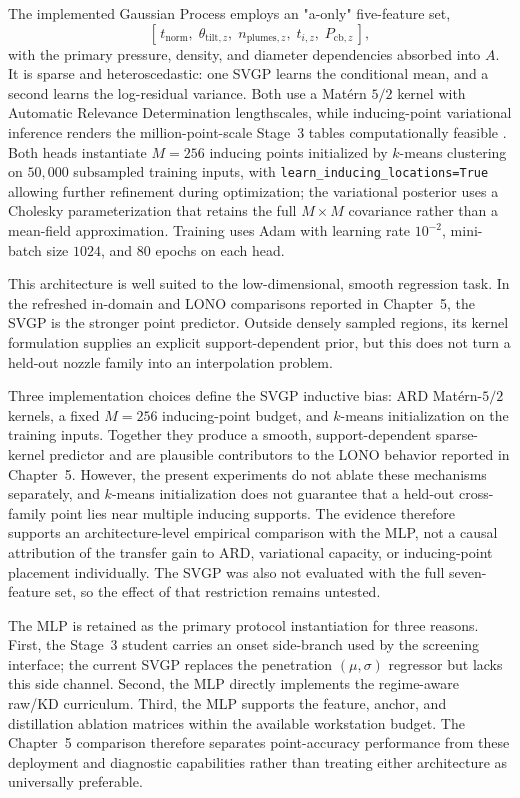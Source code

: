 The implemented Gaussian Process employs an "a-only" five-feature set,
\[
[\,t_{\mathrm{norm}},\;\theta_{\mathrm{tilt},z},\;n_{\mathrm{plumes},z},\;t_{i,z},\;P_{\mathrm{cb},z}\,],
\]
with the primary pressure, density, and diameter dependencies absorbed into $A$. It is sparse and heteroscedastic: one SVGP learns the conditional mean, and a second learns the log-residual variance. Both use a Mat\'ern $5/2$ kernel with Automatic Relevance Determination lengthscales, while inducing-point variational inference renders the million-point-scale Stage~3 tables computationally feasible \cite{RasmussenWilliams2006,HensmanFusiLawrence2013,Titsias2009SparseGP}. Both heads instantiate $M=256$ inducing points initialized by $k$-means clustering on $50{,}000$ subsampled training inputs, with \texttt{learn\_inducing\_locations=True} allowing further refinement during optimization; the variational posterior uses a Cholesky parameterization that retains the full $M\times M$ covariance rather than a mean-field approximation. Training uses Adam with learning rate $10^{-2}$, mini-batch size $1024$, and $80$ epochs on each head.

This architecture is well suited to the low-dimensional, smooth regression task. In the refreshed in-domain and LONO comparisons reported in Chapter~5, the SVGP is the stronger point predictor. Outside densely sampled regions, its kernel formulation supplies an explicit support-dependent prior, but this does not turn a held-out nozzle family into an interpolation problem.

Three implementation choices define the SVGP inductive bias: ARD Mat\'ern-$5/2$ kernels, a fixed $M=256$ inducing-point budget, and $k$-means initialization on the training inputs. Together they produce a smooth, support-dependent sparse-kernel predictor and are plausible contributors to the LONO behavior reported in Chapter~5. However, the present experiments do not ablate these mechanisms separately, and $k$-means initialization does not guarantee that a held-out cross-family point lies near multiple inducing supports. The evidence therefore supports an architecture-level empirical comparison with the MLP, not a causal attribution of the transfer gain to ARD, variational capacity, or inducing-point placement individually. The SVGP was also not evaluated with the full seven-feature set, so the effect of that restriction remains untested.

The MLP is retained as the primary protocol instantiation for three reasons. First, the Stage~3 student carries an onset side-branch used by the screening interface; the current SVGP replaces the penetration $(\mu,\sigma)$ regressor but lacks this side channel. Second, the MLP directly implements the regime-aware raw/KD curriculum. Third, the MLP supports the feature, anchor, and distillation ablation matrices within the available workstation budget. The Chapter~5 comparison therefore separates point-accuracy performance from these deployment and diagnostic capabilities rather than treating either architecture as universally preferable.


